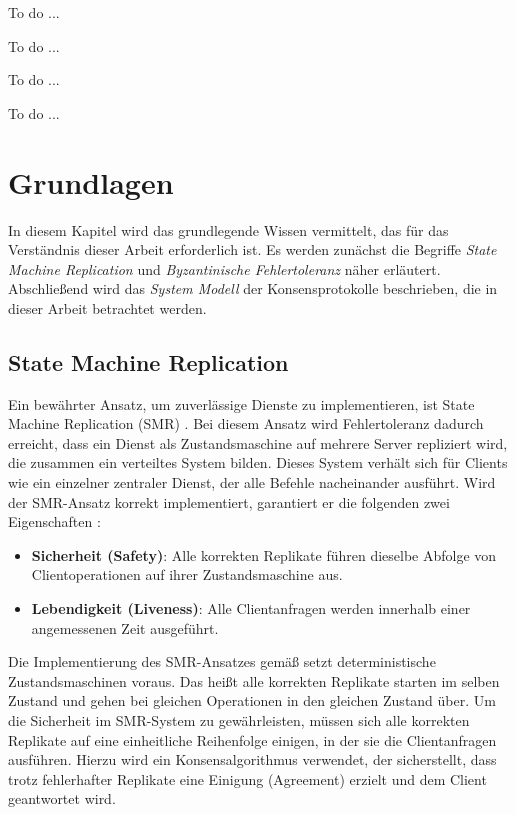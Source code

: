 \documentclass[nonacm,sigconf,natbib=false]{acmart}
\begin{document}
To do ...

To do ...

To do ...

To do ...
\section{Grundlagen}
In diesem Kapitel wird das grundlegende Wissen vermittelt, das für das Verständnis dieser Arbeit erforderlich ist. Es werden zunächst die Begriffe \emph{State Machine Replication} und \emph{Byzantinische Fehlertoleranz} näher erläutert. Abschließend wird das \emph{System Modell} der Konsensprotokolle beschrieben, die in dieser Arbeit betrachtet werden.

\subsection{State Machine Replication}

Ein bewährter Ansatz, um zuverlässige Dienste zu implementieren, ist State Machine Replication (SMR) \cite{smr-schneider}. Bei diesem Ansatz wird Fehlertoleranz dadurch erreicht, dass ein Dienst als Zustandsmaschine auf mehrere Server repliziert wird, die zusammen ein verteiltes System bilden. Dieses System verhält sich für Clients wie ein einzelner zentraler Dienst, der alle Befehle nacheinander ausführt. Wird der SMR-Ansatz korrekt implementiert, garantiert er die folgenden zwei Eigenschaften \cite{pbft-liveness-problem}:
\begin{itemize}
  \item \textbf{Sicherheit (Safety)}: Alle korrekten Replikate führen dieselbe Abfolge von Clientoperationen auf ihrer Zustandsmaschine aus.
  \item \textbf{Lebendigkeit (Liveness)}: Alle Clientanfragen werden innerhalb einer angemessenen Zeit ausgeführt.
\end{itemize}
Die Implementierung des SMR-Ansatzes gemäß \cite{smr-schneider} setzt deterministische Zustandsmaschinen voraus. Das heißt alle korrekten Replikate starten im selben Zustand und gehen bei gleichen Operationen in den gleichen Zustand über. Um die Sicherheit im SMR-System zu gewährleisten, müssen sich alle korrekten Replikate auf eine einheitliche Reihenfolge einigen, in der sie die Clientanfragen ausführen. Hierzu wird ein Konsensalgorithmus verwendet, der sicherstellt, dass trotz fehlerhafter Replikate eine Einigung (Agreement) erzielt und dem Client geantwortet wird.
\end{document}
